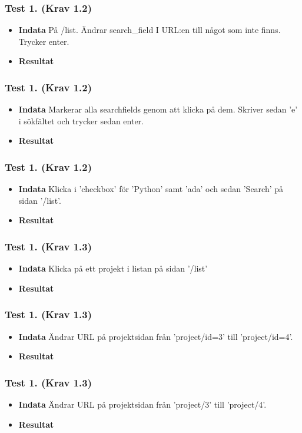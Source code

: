 \documentclass{TDP003mall}
\begin{document}
\subsubsection*{Test 1. (Krav 1.2)}
\begin{itemize}
\item[]\textbf{Indata} På /list. Ändrar search\_field I URL:en till något som inte finns. Trycker enter.
\item[]\textbf{Resultat} 
\end{itemize}
\subsubsection*{Test 1. (Krav 1.2)}
\begin{itemize}
\item[]\textbf{Indata} Markerar alla searchfields genom att klicka på dem. Skriver sedan 'e' i sökfältet och trycker sedan enter.
\item[]\textbf{Resultat} 
\end{itemize}
\subsubsection*{Test 1. (Krav 1.2)}
\begin{itemize}
\item[]\textbf{Indata} Klicka i 'checkbox' för 'Python' samt 'ada' och sedan 'Search' på sidan '/list'.
\item[]\textbf{Resultat} 
\end{itemize}
\subsubsection*{Test 1. (Krav 1.3)}
\begin{itemize}
\item[]\textbf{Indata} Klicka på ett projekt i listan på sidan '/list'
\item[]\textbf{Resultat} 
\end{itemize}
\subsubsection*{Test 1. (Krav 1.3)}
\begin{itemize}
\item[]\textbf{Indata} Ändrar URL på projektsidan från 'project/id=3' till 'project/id=4'.
\item[]\textbf{Resultat} 
\end{itemize}
\subsubsection*{Test 1. (Krav 1.3)}
\begin{itemize}
\item[]\textbf{Indata} Ändrar URL på projektsidan från 'project/3' till 'project/4'.
\item[]\textbf{Resultat} 
\end{itemize}
\end{document}
